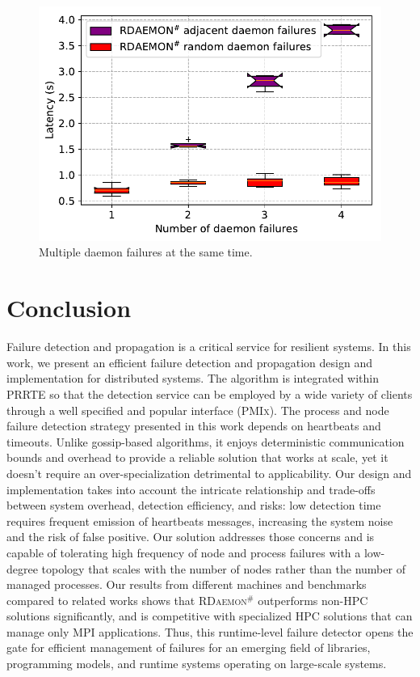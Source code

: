 \documentclass[sigconf]{acmart}
\newcommand{\prrte}[0]{\textsc{PRRTE}\xspace}
\newcommand{\pmix}[0]{\textsc{PMIx}\xspace}
\newcommand{\mpi}[0]{\textsc{MPI}\xspace}
\newcommand{\ourwork}[0]{\textsc{RDaemon}\ensuremath{^\#}\xspace}
\begin{document}
\begin{figure}[h]
  \centering
  \includegraphics[width=\linewidth]{multi_daemon_failures.pdf}
  \caption{Multiple daemon failures at the same time.}
  \label{fig:multi_daemon_failure_nacl}
\end{figure}


\section{Conclusion}\label{sec:conclusion}
Failure detection and propagation is a critical service for resilient systems. In this work, we present an efficient failure detection and propagation design and implementation for distributed systems.
The algorithm is integrated within \prrte so that the detection service
can be employed by a wide variety of clients through a well specified and
popular interface (\pmix). The process and node failure detection strategy presented in this work depends on heartbeats and timeouts. Unlike gossip-based algorithms,
it enjoys deterministic communication bounds and overhead to provide a reliable solution that works at scale,
yet it doesn't require an over-specialization detrimental to applicability.
Our design and implementation takes into account the intricate relationship and trade-offs between system overhead, detection efficiency, and risks: low detection time requires frequent emission of heartbeats messages, increasing the system noise and the risk of false positive. Our solution addresses those concerns and is capable of tolerating high frequency of node and process failures with a low-degree
topology that scales with the number of nodes rather than the number of
managed processes. Our results from different machines and benchmarks
compared to related works shows that \ourwork outperforms non-HPC solutions
significantly, and is competitive with specialized HPC solutions that can
manage only \mpi applications. Thus, this runtime-level failure detector
opens the gate for efficient management of failures for an emerging field
of libraries, programming models, and runtime systems operating on large-scale systems.
\end{document}
